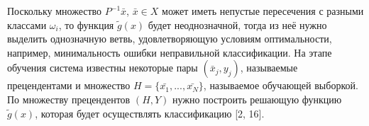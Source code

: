 \documentclass[12pt,a4paper]{article}
\begin{document}
Поскольку множество $P^{-1}\bar{x}$, $\bar{x} \in X$ может иметь непустые пересечения с разными классами $\omega_i$, то функция $\tilde{g}(x)$ будет неоднозначной, тогда из неё нужно выделить однозначную ветвь, удовлетворяющую условиям оптимальности, например, минимальность ошибки неправильной классификации. На этапе обучения система известны некоторые пары $(\bar{x}_j, y_j)$, называемые прецендентами и множество $H = \{\bar{x_1}, ...,\bar{x_N}\}$, называемое обучающей выборкой. По множеству прецендентов $(H, Y)$ нужно построить решающую функцию $\tilde{g}(x)$, которая будет осуществлять классификацию [2, 16].
\end{document}
